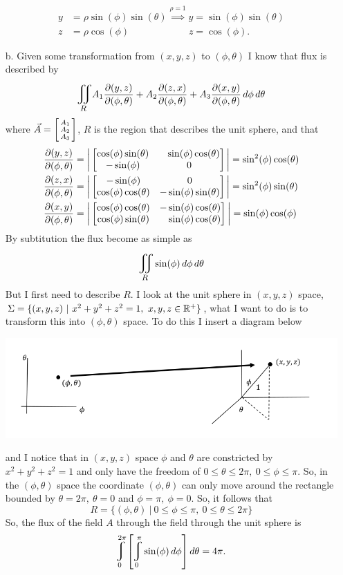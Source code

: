 \documentclass[titlepage]{article}
\begin{document}
\begin{solution}
\begin{itemize}
\begin{align*}
y &= \rho\sin(\phi)\sin(\theta) \overset{\rho = 1}{\implies} y = \sin(\phi)\sin(\theta) \\
z &= \rho\cos(\phi)\phantom{\cos(\theta) \implies} z =\cos(\phi).
\end{align*}
\item[b.] 
Given some transformation from $(x,y,z)$ to $(\phi,\theta)$ I know that flux is described by
$$ \bigiint{R}{} A_1\frac{\p (y,z)}{\p (\phi,\theta)} + A_2 \frac{\p (z,x)}{\p (\phi,\theta)} + A_3 \frac{\p (x,y)}{\p (\phi,\theta)}\,d\phi\,d\theta$$
where $\vec{A} = \left[\begin{smallmatrix}A_1 \\ A_2 \\ A_3\end{smallmatrix}\right]$, $R$ is the region that describes the unit sphere, and that
\begin{align*}
\frac{\p (y,z)}{\p (\phi,\theta)} &= \bigg|\bmat{\cos(\phi)\sin(\theta) & \phantom{-}\sin(\phi)\cos(\theta) \\ -\sin(\phi) & 0}\bigg| = \sin^2(\phi)\cos(\theta) \\
\frac{\p (z,x)}{\p (\phi,\theta)} &= \bigg|\bmat{-\sin(\phi) & 0 \\ \cos(\phi)\cos(\theta) & -\sin(\phi)\sin(\theta)}\bigg| = \sin^2(\phi)\sin(\theta) \\
\frac{\p (x,y)}{\p (\phi,\theta)} &= \bigg|\bmat{\cos(\phi)\cos(\theta) & -\sin(\phi)\cos(\theta) \\ \cos(\phi)\sin(\theta) & \phantom{-}\sin(\phi)\cos(\theta)}\bigg| = \sin(\phi)\cos(\phi ) 
\end{align*}
By subtitution the flux become as simple as 
$$\bigiint{R}{} \sin(\phi)\,d\phi\,d\theta$$
But I first need to describe $R$. I look at the unit sphere in $(x,y,z)$ space, $\Sigma = \{(x,y,z) \ | \ x^2 + y^2 + z^2 = 1, \ x,y,z \in \mathbb{R}^+\}$, what I want to do is to transform this into $(\phi,\theta)$ space. To do this I insert a diagram below
\begin{center}\includegraphics[scale=.7]{transform.png} \end{center}
and I notice that in $(x,y,z)$ space $\phi$ and $\theta$ are constricted by $x^2 + y^2 + z^2 = 1$ and only have the freedom of $0\leq\theta\leq2\pi, \ 0\leq\phi\leq\pi$. So, in the $(\phi,\theta)$ space the coordinate $(\phi,\theta)$ can only move around the rectangle bounded by $\theta = 2\pi, \ \theta = 0$ and $\phi = \pi, \ \phi = 0$. So, it follows that
$$R = \{(\phi,\theta) \ | \ 0\leq\phi\leq\pi , \ 0\leq\theta\leq2\pi\} $$
So, the flux of the field $A$ through the field through the unit sphere is
$$\mlvarint\limits_{0}^{2\pi}\left[\mlvarint\limits_{0}^{\pi} \sin(\phi)\,d\phi\right]d\theta = 4\pi.$$
\end{itemize}
\end{solution}
\end{document}
